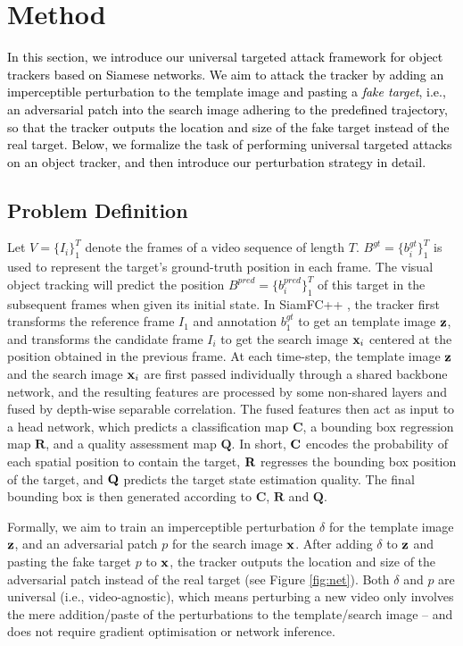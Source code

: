 \documentclass{article}
\begin{document}
\section{Method}

\textcolor{black}{In this section, we introduce our universal targeted attack framework for object trackers based on Siamese networks. We aim to attack the tracker by adding an imperceptible perturbation to the template image and pasting a \textit{fake target}, i.e., an adversarial patch into the search image adhering to the predefined trajectory, so that the tracker outputs the location and size of the fake target instead of the real target. Below, we formalize the task of performing universal targeted attacks on an object tracker, and then introduce our perturbation strategy in detail.}
 
\subsection{Problem Definition}

Let $V=\{I_i\}_1^T$ denote the frames of a video sequence of length $T$.
$B^{gt}=\{b^{gt}_i\}_1^T$ is used to represent the target's ground-truth position in each frame.
The visual object tracking will predict the position $B^{pred}=\{b^{pred}_i\}_1^T$ of this target in the subsequent frames when given its initial state.
In SiamFC++ \cite{SiamFC++}, the tracker first transforms the reference frame $I_1$ and annotation $b_1^{gt}$ to get an template image $\textbf z$, and transforms the candidate frame $I_i$ to get the search image $\textbf x_i$ centered at the position obtained in the previous frame.
At each time-step, the template image $\textbf z$ and the search image $\textbf x_i$ are first passed individually through a shared backbone network, and the resulting features are processed by some non-shared layers and fused by depth-wise separable correlation. The fused features then act as input to a head network, which predicts a classification map $\textbf{C}$, a bounding box regression map $\textbf{R}$, and a quality assessment map $\textbf{Q}$. In short, $\textbf C$ encodes the probability of each spatial position to contain the target, $\textbf R$ regresses the bounding box position of the target, and $\textbf Q$ predicts the target state estimation quality. The final bounding box is then generated according to $\textbf{C}$, $\textbf{R}$ and $\textbf{Q}$.

Formally, we aim to train an imperceptible perturbation $\delta$ for the template image $\textbf z$, and an adversarial patch $p$ for the search image $\textbf x$. After adding $\delta$ to $\textbf z$ and pasting the fake target $p$ to $\textbf x$, the tracker outputs the location and size of the adversarial patch instead of the real target (see Figure \ref{fig:net}).
Both $\delta$ and $p$ are universal (i.e., video-agnostic), which means perturbing a new video only involves the mere addition/paste of the perturbations to the template/search image -- and does not require gradient optimisation or network inference.
\end{document}
